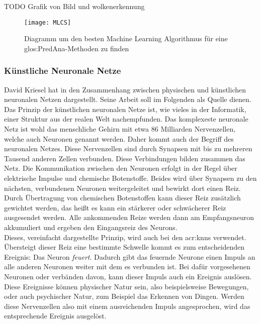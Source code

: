 TODO Grafik von Bild und wolkenerkennung\\

\begin{figure}%
	\centering
    \texttt{[image: MLCS]}
    \caption{Diagramm um den besten Machine Learning Algorithmus für eine \gls{glos:PredAna}-Methoden zu finden \cite{bib:AzureCs}}
    \label{fig:MLCS}
\end{figure}
  
\subsubsection{Künstliche Neuronale Netze}
\label{sec:KNN}
David Kriesel hat in \cite{bib:UebereblickNN} den Zusammenhang zwischen physischen und künstlichen neuronalen Netzen dargestellt. Seine Arbeit soll im Folgenden als Quelle dienen. Das Prinzip der künstlichen neuronalen Netze ist, wie vieles in der Informatik, einer Struktur aus der realen Welt nachempfunden. Das komplexeste neuronale Netz ist wohl das menschliche Gehirn mit etwa 86 Milliarden Nervenzellen, welche auch Neuronen genannt werden. Daher kommt auch der Begriff des neuronalen Netzes. Diese Nervenzellen sind durch Synapsen mit bis zu mehreren Tausend anderen Zellen verbunden. Diese Verbindungen bilden zusammen das Netz. Die Kommunikation zwischen den Neuronen erfolgt in der Regel über elektrische Impulse und chemische Botenstoffe. Beides wird über Synapsen zu den nächsten, verbundenen Neuronen weitergeleitet und bewirkt dort einen Reiz. Durch Übertragung von chemischen Botenstoffen kann dieser Reiz zusätzlich gewichtet werden, das heißt es kann ein stärkerer oder schwächerer Reiz ausgesendet werden. Alle ankommenden Reize werden dann am Empfangsneuron akkumuliert und ergeben den Eingangsreiz des Neurons.\\ 

Dieses, vereinfacht dargestellte Prinzip, wird auch bei den  \acrshort{acr:knn}s verwendet. Übersteigt dieser Reiz eine bestimmte Schwelle kommt es zum entscheidenden Ereignis: Das Neuron \textit{feuert}. Dadurch gibt das feuernde Neurone einen Impuls an alle anderen Neuronen weiter mit dem es verbunden ist. Bei dafür vorgesehenen Neuronen oder verbänden davon, kann dieser Impuls auch ein Ereignis auslösen. Diese Ereignisse können physischer Natur sein, also beispielsweise Bewegungen, oder auch psychischer Natur, zum Beispiel das Erkennen von Dingen. Werden diese Nervenzellen also mit einem ausreichenden Impuls angesprochen, wird das entsprechende Ereignis ausgelöst.\\

